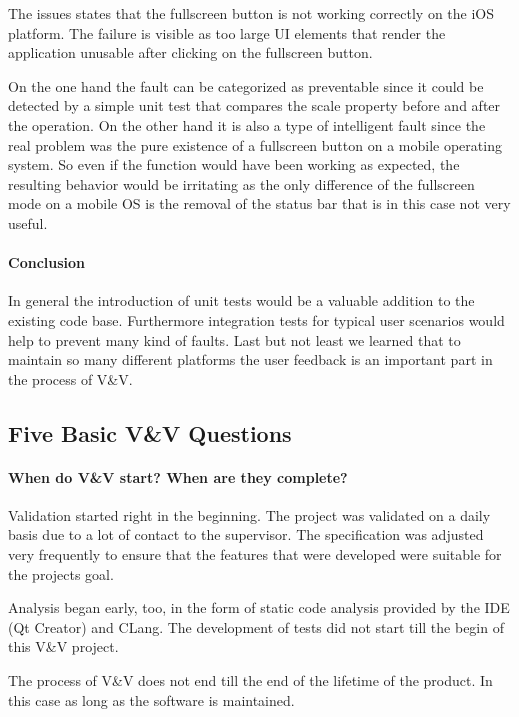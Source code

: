 \documentclass{scrartcl}
\begin{document}
The issues states that the fullscreen button is not working correctly on the iOS platform. The failure is visible as too large UI elements that render the application unusable after clicking on the fullscreen button.

On the one hand the fault can be categorized as preventable since it could be detected by a simple unit test that compares the scale property before and after the operation.
On the other hand it is also a type of intelligent fault since the real problem was the pure existence of a fullscreen button on a mobile operating system. So even if the function would have been working as expected, the resulting behavior would be irritating as the only difference of the fullscreen mode on a mobile OS is the removal of the status bar that is in this case not very useful.

\paragraph{Conclusion}
In general the introduction of unit tests would be a valuable addition to the existing code base. Furthermore integration tests for typical user scenarios would help to prevent many kind of faults. Last but not least we learned that to maintain so many different platforms the user feedback is an important part in the process of V\&V.


\subsection{Five Basic V\&V Questions}

\paragraph{When do V\&V start?  When are they complete?}

Validation started right in the beginning. The project was validated on a daily basis  due to a lot of contact to the supervisor. The specification was adjusted very frequently to ensure that the features that were developed were suitable for the projects goal.

Analysis began early, too, in the form of static code analysis provided by the IDE (Qt Creator) and CLang. The development of tests did not start till the begin of this V\&V project.

The process of V\&V does not end till the end of the lifetime of the product. In this case as long as the software is maintained.
\end{document}
